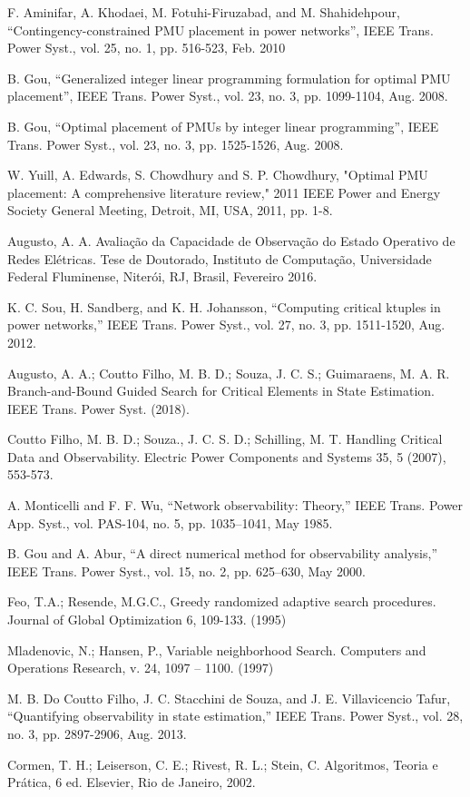 \documentclass[12pt]{article}
\begin{document}
\begin{thebibliography}{99}
	 F. Aminifar, A. Khodaei, M. Fotuhi-Firuzabad, and M. Shahidehpour, “Contingency-constrained PMU placement in power networks”, IEEE Trans. Power Syst., vol. 25, no. 1, pp. 516-523, Feb. 2010
	
	 B. Gou, “Generalized integer linear programming formulation for optimal PMU placement”, IEEE Trans. Power Syst., vol. 23, no. 3, pp. 1099-1104, Aug. 2008.
	
	 B. Gou, “Optimal placement of PMUs by integer linear programming”, IEEE Trans. Power Syst., vol. 23, no. 3, pp. 1525-1526, Aug. 2008.
	
	 W. Yuill, A. Edwards, S. Chowdhury and S. P. Chowdhury, "Optimal PMU placement: A comprehensive literature review," 2011 IEEE Power and Energy Society General Meeting, Detroit, MI, USA, 2011, pp. 1-8.
	
	 Augusto, A. A. Avaliação da Capacidade de Observação do Estado Operativo de Redes Elétricas. Tese de Doutorado, Instituto de Computação, Universidade Federal Fluminense, Niterói, RJ, Brasil, Fevereiro 2016.
	
	 K. C. Sou, H. Sandberg, and K. H. Johansson, “Computing critical ktuples in power networks,” IEEE Trans. Power Syst., vol. 27, no. 3, pp.
	1511-1520, Aug. 2012.
	
	 Augusto, A. A.; Coutto Filho, M. B. D.; Souza, J. C. S.; Guimaraens, M.
	A. R. Branch-and-Bound Guided Search for Critical Elements in State Estimation.
	IEEE Trans. Power Syst. (2018).
	
	 Coutto Filho, M. B. D.; Souza., J. C. S. D.; Schilling, M. T. Handling
	Critical Data and Observability. Electric Power Components and Systems 35, 5
	(2007), 553-573.
	
	A. Monticelli and F. F. Wu, “Network observability: Theory,” IEEE Trans. Power App. Syst., vol. PAS-104, no. 5, pp. 1035–1041, May 1985.
	
	 B. Gou and A. Abur, “A direct numerical method for observability analysis,” IEEE Trans. Power Syst., vol. 15, no. 2, pp. 625–630, May 2000.
	
	Feo, T.A.; Resende, M.G.C., Greedy randomized adaptive search procedures. Journal of Global Optimization 6, 109-133. (1995)

 	
	Mladenovic, N.; Hansen, P., Variable neighborhood Search. Computers and Operations Research, v. 24, 1097 – 1100. (1997)
	
	M. B. Do Coutto Filho, J. C. Stacchini de Souza, and J. E. Villavicencio Tafur, “Quantifying observability in state estimation,” IEEE Trans. Power Syst., vol. 28, no. 3, pp. 2897-2906, Aug. 2013.
	
	Cormen, T. H.; Leiserson, C. E.; Rivest, R. L.; Stein, C. Algoritmos, Teoria e Prática, 6 ed. Elsevier, Rio de Janeiro, 2002.

	
\end{thebibliography}


  
\end{document}
